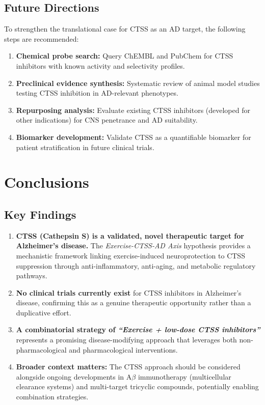 \documentclass[11pt, a4paper]{article}
\begin{document}
\subsection{Future Directions}

To strengthen the translational case for CTSS as an AD target, the following steps are recommended:

\begin{enumerate}
    \item \textbf{Chemical probe search:} Query ChEMBL and PubChem for CTSS inhibitors with known activity and selectivity profiles.
    \item \textbf{Preclinical evidence synthesis:} Systematic review of animal model studies testing CTSS inhibition in AD-relevant phenotypes.
    \item \textbf{Repurposing analysis:} Evaluate existing CTSS inhibitors (developed for other indications) for CNS penetrance and AD suitability.
    \item \textbf{Biomarker development:} Validate CTSS as a quantifiable biomarker for patient stratification in future clinical trials.
\end{enumerate}

\section{Conclusions}

\subsection{Key Findings}

\begin{enumerate}
    \item \textbf{CTSS (Cathepsin S) is a validated, novel therapeutic target for Alzheimer's disease.} The \textit{Exercise-CTSS-AD Axis} hypothesis provides a mechanistic framework linking exercise-induced neuroprotection to CTSS suppression through anti-inflammatory, anti-aging, and metabolic regulatory pathways.
    
    \item \textbf{No clinical trials currently exist} for CTSS inhibitors in Alzheimer's disease, confirming this as a genuine therapeutic opportunity rather than a duplicative effort.
    
    \item \textbf{A combinatorial strategy of \textit{``Exercise + low-dose CTSS inhibitors''}} represents a promising disease-modifying approach that leverages both non-pharmacological and pharmacological interventions.
    
    \item \textbf{Broader context matters:} The CTSS approach should be considered alongside ongoing developments in A$\beta$ immunotherapy (multicellular clearance systems) and multi-target tricyclic compounds, potentially enabling combination strategies.
\end{enumerate}
\end{document}
